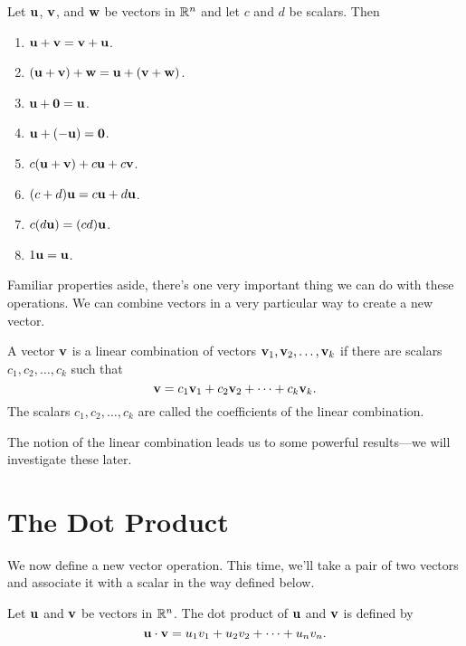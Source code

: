 \documentclass[../m073main.tex]{subfiles}
\begin{document}
\begin{theorem}
	Let $\mathbf{u}$, $\mathbf{v}$, and $\mathbf{w}$ be vectors in $\mathbb{R}^n$ and let $c$ and $d$ be scalars.
	Then
	\begin{enumerate}[label=(\alph*)]
		\item $\mathbf{u} + \mathbf{v} = \mathbf{v} + \mathbf{u}$.
		\item $(\mathbf{u} + \mathbf{v}) + \mathbf{w} = \mathbf{u} + (\mathbf{v} + \mathbf{w})$.
		\item $\mathbf{u} + \mathbf{0} = \mathbf{u}$.
		\item $\mathbf{u} + (-\mathbf{u}) = \mathbf{0}$.
		\item $c(\mathbf{u} + \mathbf{v}) + c \mathbf{u} + c \mathbf{v}$.
		\item $(c + d) \mathbf{u} = c \mathbf{u} + d \mathbf{u}$.
		\item $c(d \mathbf{u}) = (cd) \mathbf{u}$.
		\item $1 \mathbf{u} = \mathbf{u}$.
	\end{enumerate}
\end{theorem}

Familiar properties aside, there's one very important thing we can do with these operations.
We can combine vectors in a very particular way to create a new vector.

\begin{definition}
	A vector $\mathbf{v}$ is a linear combination of vectors $\mathbf{v}_1, \mathbf{v}_2, \ldots, \mathbf{v}_k$ if there are scalars $c_1, c_2, \ldots, c_k$ such that
	\[ \mathbf{v} = c_1 \mathbf{v}_1 + c_2 \mathbf{v}_2 + \cdots + c_k \mathbf{v}_k. \]
	The scalars $c_1, c_2, \ldots, c_k$ are called the coefficients of the linear combination.
\end{definition}

The notion of the linear combination leads us to some powerful results---we will investigate these later.

\section{The Dot Product}
We now define a new vector operation.
This time, we'll take a pair of two vectors and associate it with a scalar in the way defined below.

\begin{definition}
	Let $\mathbf{u}$ and $\mathbf{v}$ be vectors in $\mathbb{R}^n$.
	The dot product of $\mathbf{u}$ and $\mathbf{v}$ is defined by
	\[ \mathbf{u} \cdot \mathbf{v} = u_1 v_1 + u_2 v_2 + \cdots + u_n v_n. \]
\end{definition}
\end{document}
